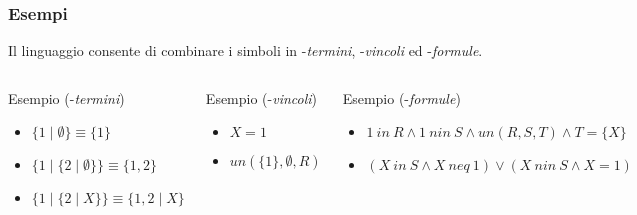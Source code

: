 \documentclass{beamer}
\begin{document}
\begin{frame}
  \frametitle{Esempi} Il linguaggio \lset{} consente di combinare i
  simboli in \lset{}-\textit{termini}, \lset{}-\textit{vincoli} ed
  \lset{}-\textit{formule}.
  \begin{columns}[c]
    \begin{exampleblock}{Esempio (\lset{}-\textit{termini})}
      \begin{itemize}
      \item $\{1 \mid \emptyset \} \equiv \{1\}$
      \item $\{1 \mid \{2 \mid \emptyset \} \} \equiv \{1,2\}$
      \item $\{1 \mid \{2 \mid X \} \} \equiv \{1,2 \mid X \}$
      \end{itemize}
    \end{exampleblock}
    \begin{exampleblock}{Esempio (\lset{}-\textit{vincoli})}
      \begin{itemize}
      \item $X = 1$
      \item $un(\{1\}, \emptyset, R)$
      \end{itemize}
    \end{exampleblock}
    \begin{exampleblock}{Esempio (\lset{}-\textit{formule})}
      \begin{itemize}
      \item $1\ in\ R \land 1\ nin\ S \land un(R,S,T) \land T = \{X\}$
      \item $(X\ in\ S \land X\ neq\ 1) \lor (X\ nin\ S \land X = 1)$
      \end{itemize}
    \end{exampleblock}
  \end{columns}
\end{frame}

\end{document}
